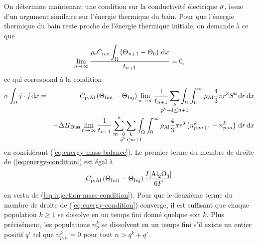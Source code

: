 On détermine maintenant une condition sur la conductivité
électrique $\sigma$, issue d'un argument similaire sur
l'énergie thermique du bain. Pour que l'énergie thermique du bain
reste proche de l'énergie thermique initiale, on demande à ce que
\begin{equation}
  \lim_{n\to\infty}\frac{\rho_\mathrm{e}C_{\mathrm{p,e}}\displaystyle\int_\Omega\left( \Theta_{n+1}
    - \Theta_0 \right)\,\mathrm dx}{t_{n+1}} = 0,
\end{equation}
ce qui correspond à la condition
\begin{eqnarray}
  \conductivity \int_\Omega j\cdot j\intd{x} &=&
  \aluminahc\parent{\tinit - \tinj}\lim_{n\to\infty}\frac{1}{t_{n+1}}\sum_{\mathclap{\substack{k\\ p^k +
  1 \leq n + 1}}}\int_\Omega\int_0^\infty\aluminadensity
  \frac{4}{3}\pi r^3 S^k\intd{r}\intd{x}\nonumber \\
  &&+ {\aluminadissolutionenthalpy}\lim_{n\to\infty}\frac{1}{t_{n+1}}\sum_{m = 0}^{n}\sum_{\mathclap{\substack{k\\ q^k < m + 1}}} \int_\Omega\int_0^\infty \aluminadensity \frac{4}{3}\pi r^3\parent{n_{p,m+1}^k-n_{p,m}^k}\intd{r}\intd{x}\label{eq:energy-condition}
\end{eqnarray}
en considérant (\ref{eq:energy-mass-balance}). Le premier terme du
membre de droite de (\ref{eq:energy-condition}) est égal à
\begin{equation*}
\aluminahc\parent{\tinit-\tinj}  \frac{I[\cee{Al2O3}]}{6F}
\end{equation*}
en vertu de (\ref{eq:injection-mass-condition}). Pour que le deuxième
terme du membre de droite de (\ref{eq:energy-condition}) converge, il
est suffisant que chaque population $k\geq 1$ se dissolve en un temps
fini donné quelque soit $k$. Plus précisément, les populations $n_p^k$
se dissolvent en un temps fini s'il existe un entier positif $q'$ tel
que $n_{p,n}^k = 0$ pour tout $n > q^k + q'$.

